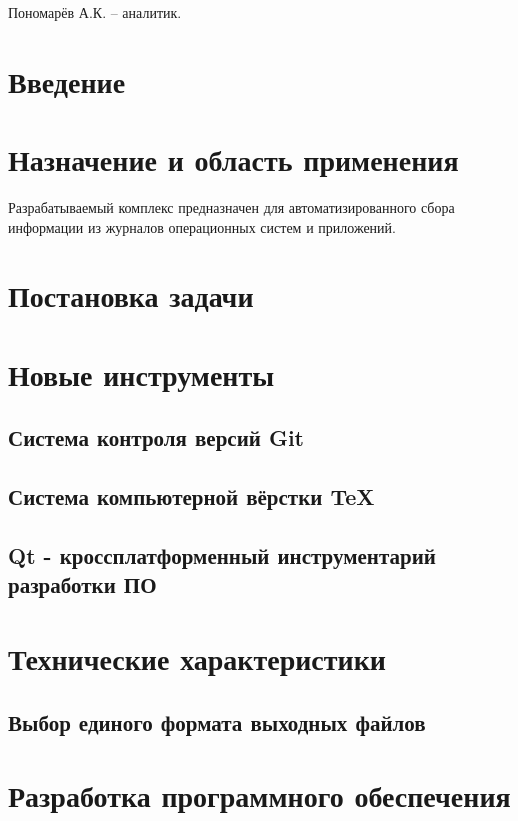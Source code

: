 \documentclass[russian,utf8,14pt,simple]{eskdtext}
\begin{document}
Пономарёв А.К. -- аналитик.

\newpage
{}
\renewcommand\contentsname{\hfill Содержание \hfill}
\tableofcontents

\newpage
{}
\section{Введение}


\section{Назначение и область применения}
Разрабатываемый комплекс предназначен для автоматизированного сбора информации из журналов операционных систем и приложений.
\section{Постановка задачи}
\setcounter{figure}{0}

\section{Новые инструменты}
\setcounter{figure}{0}
\subsection{Система контроля версий Git}

\subsection{Система компьютерной вёрстки TeX}

\subsection{Qt - кроссплатформенный инструментарий разработки ПО}


\section{Технические характеристики}

\subsection{Выбор единого формата выходных файлов}


\section{Разработка программного обеспечения}
\setcounter{figure}{0}
\end{document}
